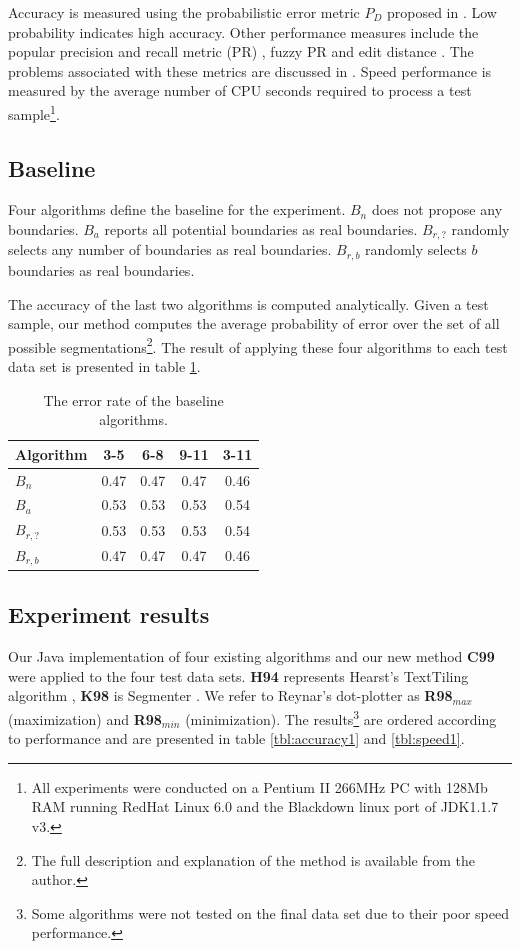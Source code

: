 \documentclass[11pt]{article}
\begin{document}
Accuracy is measured using the probabilistic error metric $P_D$ proposed in \cite{beeferman_et_al_1999}. Low probability indicates high accuracy. Other performance measures include the popular precision and recall metric (PR) \cite{hearst_1994}, fuzzy PR \cite{reynar_1998} and edit distance \cite{ponte_croft_1997}. The problems associated with these metrics are discussed in \cite{beeferman_et_al_1999}. Speed performance is measured by the average number of CPU seconds required to process a test sample\footnote{All experiments were conducted on a Pentium II 266MHz PC with 128Mb RAM running RedHat Linux 6.0 and the Blackdown linux port of JDK1.1.7 v3.}.

\subsection{Baseline}
Four algorithms define the baseline for the experiment. $B_n$ does not propose any boundaries. $B_a$ reports all potential boundaries as real boundaries. $B_{r,?}$ randomly selects any number of boundaries as real boundaries. $B_{r,b}$ randomly selects $b$ boundaries as real boundaries.

The accuracy of the last two algorithms is computed analytically. Given a test sample, our method computes the average probability of error over the set of all possible segmentations\footnote{The full description and explanation of the method is available from the author.}. The result of applying these four algorithms to each test data set is presented in table \ref{tbl:baseline}.

\begin{table}[ht]
\begin{center}
\begin{tabular}{|l|c|c|c|c|}
\hline
Algorithm & 3-5 & 6-8 & 9-11 & 3-11\\
\hline
$B_n$ & 0.47 & 0.47 & 0.47 & 0.46\\
$B_a$ & 0.53 & 0.53 & 0.53 & 0.54\\
$B_{r,?}$ & 0.53 & 0.53 & 0.53 & 0.54\\
$B_{r,b}$ & 0.47 & 0.47 & 0.47 & 0.46\\
\hline
\end{tabular}
\end{center}
\caption{The error rate of the baseline algorithms.}
\label{tbl:baseline}
\end{table}

\subsection{Experiment results}
Our Java implementation of four existing algorithms and our new method {\bf C99} were applied to the four test data sets. {\bf H94} represents Hearst's TextTiling algorithm \cite{hearst_1994}, {\bf K98} is Segmenter \cite{kan_et_al_1998}. We refer to Reynar's dot-plotter \cite{reynar_1998} as {\bf R98$_{max}$} (maximization) and {\bf R98$_{min}$} (minimization). The results\footnote{Some algorithms were not tested on the final data set due to their poor speed performance.} are ordered according to performance and are presented in table \ref{tbl:accuracy1} and \ref{tbl:speed1}.
\end{document}
